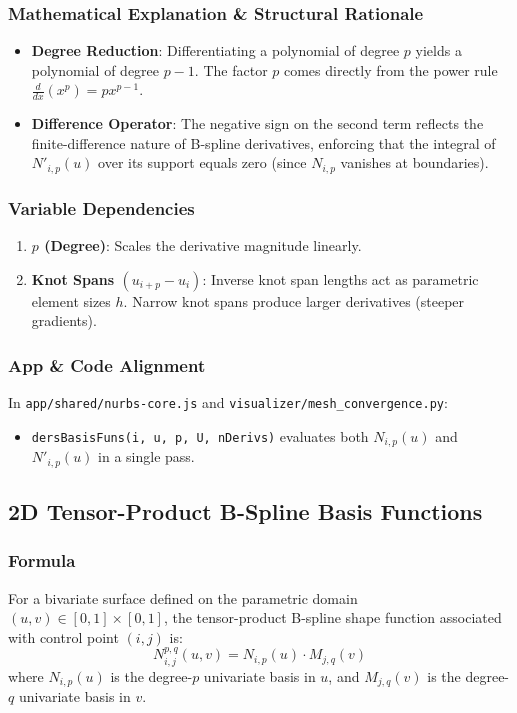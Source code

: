 \subsubsection{Mathematical Explanation \& Structural Rationale}
\begin{itemize}
    \item \textbf{Degree Reduction}: Differentiating a polynomial of degree $p$ yields a polynomial of degree $p-1$. The factor $p$ comes directly from the power rule $\frac{d}{dx}(x^p) = p x^{p-1}$.
    \item \textbf{Difference Operator}: The negative sign on the second term reflects the finite-difference nature of B-spline derivatives, enforcing that the integral of $N'_{i,p}(u)$ over its support equals zero (since $N_{i,p}$ vanishes at boundaries).
\end{itemize}

\subsubsection{Variable Dependencies}
\begin{enumerate}
    \item \textbf{$p$ (Degree)}: Scales the derivative magnitude linearly.
    \item \textbf{Knot Spans $(u_{i+p} - u_i)$}: Inverse knot span lengths act as parametric element sizes $h$. Narrow knot spans produce larger derivatives (steeper gradients).
\end{enumerate}

\subsubsection{App \& Code Alignment}
In \texttt{app/shared/nurbs-core.js} and \texttt{visualizer/mesh\_convergence.py}:
\begin{itemize}
    \item \texttt{dersBasisFuns(i, u, p, U, nDerivs)} evaluates both $N_{i,p}(u)$ and $N'_{i,p}(u)$ in a single pass.
\end{itemize}

\hr

\subsection{2D Tensor-Product B-Spline Basis Functions}

\subsubsection{Formula}
For a bivariate surface defined on the parametric domain $(u, v) \in [0, 1] \times [0, 1]$, the tensor-product B-spline shape function associated with control point $(i, j)$ is:
\begin{equation}
N_{i,j}^{p,q}(u, v) = N_{i,p}(u) \cdot M_{j,q}(v)
\end{equation}
where $N_{i,p}(u)$ is the degree-$p$ univariate basis in $u$, and $M_{j,q}(v)$ is the degree-$q$ univariate basis in $v$.

